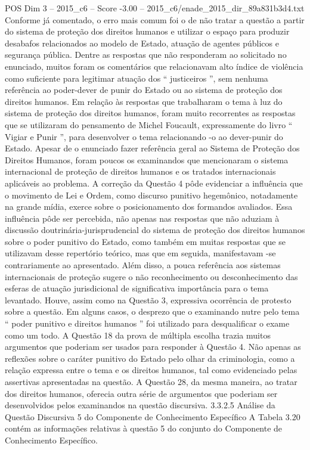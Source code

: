 \begin{textsample}{POS Dim 3 – 2015\_c6 – Score -3.00 – 2015\_c6/enade\_2015\_dir\_89a831b3d4.txt}
Conforme já comentado, o erro mais comum foi o de não tratar a questão a partir do sistema de proteção dos direitos humanos e utilizar o espaço para produzir desabafos relacionados ao modelo de Estado, atuação de agentes públicos e segurança pública.
Dentre as respostas que não responderam ao solicitado no enunciado, muitos foram os comentários que relacionavam alto índice de violência como suficiente para legitimar atuação dos “ justiceiros ”, sem nenhuma referência ao poder-dever de punir do Estado ou ao sistema de proteção dos direitos humanos.
Em relação às respostas que trabalharam o tema à luz do sistema de proteção dos direitos humanos, foram muito recorrentes as respostas que se utilizaram do pensamento de Michel Foucault, expressamente do livro “ Vigiar e Punir ”, para desenvolver o tema relacionando -o ao dever-punir do Estado.
Apesar de o enunciado fazer referência geral ao Sistema de Proteção dos Direitos Humanos, foram poucos os examinandos que mencionaram o sistema internacional de proteção de direitos humanos e os tratados internacionais aplicáveis ao problema.
A correção da Questão 4 pôde evidenciar a influência que o movimento de Lei e Ordem, como discurso punitivo hegemônico, notadamente na grande mídia, exerce sobre o posicionamento dos formandos avaliados.
Essa influência pôde ser percebida, não apenas nas respostas que não aduziam à discussão doutrinária-jurisprudencial do sistema de proteção dos direitos humanos sobre o poder punitivo do Estado, como também em muitas respostas que se utilizavam desse repertório teórico, mas que em seguida, manifestavam -se contrariamente ao apresentado.
Além disso, a pouca referência aos sistemas internacionais de proteção sugere o não reconhecimento ou desconhecimento das esferas de atuação jurisdicional de significativa importância para o tema levantado.
Houve, assim como na Questão 3, expressiva ocorrência de protesto sobre a questão.
Em alguns casos, o desprezo que o examinando nutre pelo tema “ poder punitivo e direitos humanos ” foi utilizado para desqualificar o exame como um todo.
A Questão 18 da prova de múltipla escolha trazia muitos argumentos que poderiam ser usados para responder à Questão 4.
Não apenas as reflexões sobre o caráter punitivo do Estado pelo olhar da criminologia, como a relação expressa entre o tema e os direitos humanos, tal como evidenciado pelas assertivas apresentadas na questão.
A Questão 28, da mesma maneira, ao tratar dos direitos humanos, oferecia outra série de argumentos que poderiam ser desenvolvidos pelos examinandos na questão discursiva. 3.3.2.5 Análise da Questão Discursiva 5 do Componente de Conhecimento Específico A Tabela 3.20 contém as informações relativas à questão 5 do conjunto do Componente de Conhecimento Específico.

\end{textsample}
